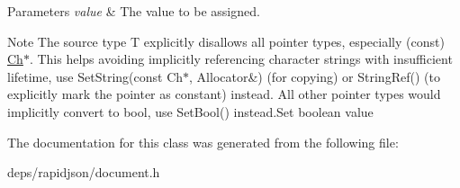 \begin{DoxyParams}{Parameters}
{\em value} & The value to be assigned.\\
\hline
\end{DoxyParams}
\begin{DoxyNote}{Note}
The source type {\ttfamily T} explicitly disallows all pointer types, especially ({\ttfamily const}) \hyperlink{class_generic_value_ade0e0ce64ccd5d852da57a35e720bafb}{Ch}$\ast$. This helps avoiding implicitly referencing character strings with insufficient lifetime, use Set\+String(const Ch$\ast$, Allocator\&) (for copying) or String\+Ref() (to explicitly mark the pointer as constant) instead. All other pointer types would implicitly convert to {\ttfamily bool}, use Set\+Bool() instead.\+Set boolean value 
\end{DoxyNote}


The documentation for this class was generated from the following file\+:\begin{DoxyCompactItemize}
\item 
deps/rapidjson/document.\+h\end{DoxyCompactItemize}

